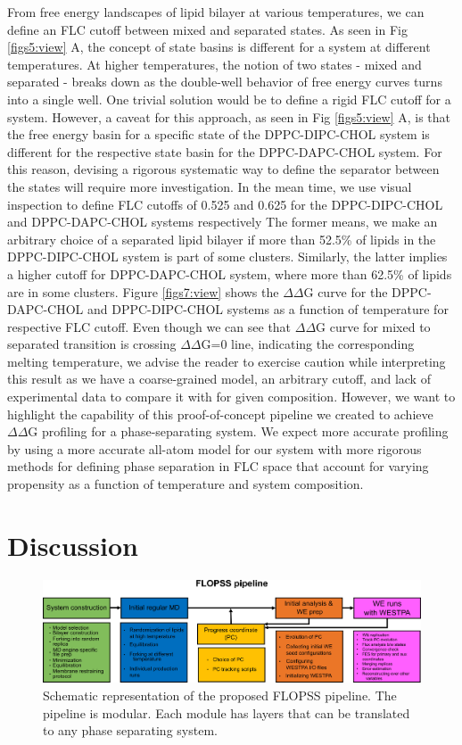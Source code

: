 \documentclass{biophys-new}
\begin{document}
From free energy landscapes of lipid bilayer at various temperatures, we can define an FLC cutoff between mixed and separated states.
As seen in Fig \ref{figs5:view} A, the concept of state basins is different for a system at different temperatures.
At higher temperatures, the notion of two states - mixed and separated - breaks down as the double-well behavior of free energy curves turns into a single well. 
One trivial solution would be to define a rigid FLC cutoff for a system.
However, a caveat for this approach, as seen in Fig \ref{figs5:view} A, is that the free energy basin for a specific state of the DPPC-DIPC-CHOL system is different for the respective state basin for the DPPC-DAPC-CHOL system.
For this reason, devising a rigorous systematic way to define the separator between the states will require more investigation. In the mean time, we use visual inspection to define FLC cutoffs of 0.525 and 0.625 for the DPPC-DIPC-CHOL and DPPC-DAPC-CHOL systems respectively
The former means, we make an arbitrary choice of a separated lipid bilayer if more than 52.5\% of lipids in the DPPC-DIPC-CHOL system is part of some clusters.
Similarly, the latter implies a higher cutoff for DPPC-DAPC-CHOL system, where more than 62.5\% of lipids are in some clusters. 
Figure \ref{figs7:view} shows the $\Delta\Delta$G curve for the DPPC-DAPC-CHOL and DPPC-DIPC-CHOL systems as a function of temperature for respective FLC cutoff.
Even though we can see that $\Delta\Delta$G curve for mixed to separated transition is crossing $\Delta\Delta$G=0 line, indicating the corresponding melting temperature,
we advise the reader to exercise caution while interpreting this result as we have a coarse-grained model, an arbitrary cutoff, and lack of experimental data to compare it with for given composition.
However, we want to highlight the capability of this proof-of-concept pipeline we created to achieve $\Delta\Delta$G profiling for a phase-separating system.
We expect more accurate profiling by using a more accurate all-atom model for our system with more rigorous methods for defining phase separation in FLC space that account for 
varying propensity as a function of temperature and system composition.

\section*{Discussion}

\begin{figure}[hbt!]
\centering
\includegraphics[width=1\linewidth]{Figures/Main/8/placeholder.jpg}
\caption{Schematic representation of the proposed FLOPSS pipeline. The pipeline is modular. Each module has layers that can be translated to any phase separating system.}
\label{figs8:view}
\end{figure}
\end{document}
